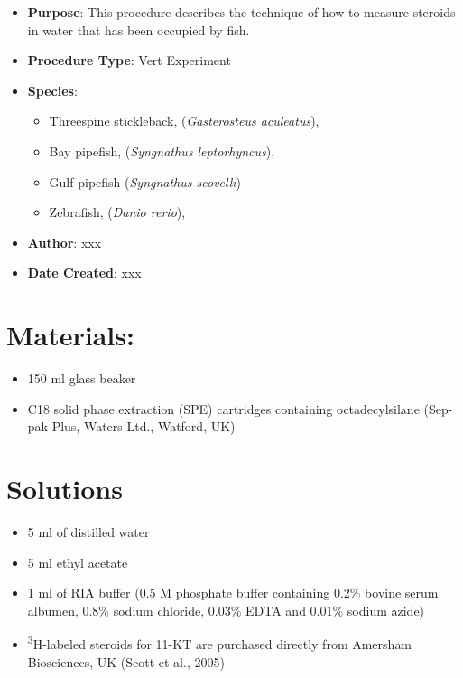 \documentclass[
  letterpaper,
  DIV=11,
  numbers=noendperiod]{scrreprt}
\providecommand{\tightlist}{%
  \setlength{\itemsep}{0pt}\setlength{\parskip}{0pt}}\usepackage{longtable,booktabs,array}
\begin{document}
\begin{itemize}
\tightlist
\item
  \textbf{Purpose}: This procedure describes the technique of how to
  measure steroids in water that has been occupied by fish.
\item
  \textbf{Procedure Type}: Vert Experiment
\item
  \textbf{Species}:

  \begin{itemize}
  \tightlist
  \item
    Threespine stickleback, (\emph{Gasterosteus aculeatus}),
  \item
    Bay pipefish, (\emph{Syngnathus leptorhyncus}),
  \item
    Gulf pipefish (\emph{Syngnathus scovelli})
  \item
    Zebrafish, (\emph{Danio rerio}),
  \end{itemize}
\item
  \textbf{Author}: xxx
\item
  \textbf{Date Created}: xxx
\end{itemize}

\hypertarget{materials}{%
\section{Materials:}\label{materials}}

\begin{itemize}
\tightlist
\item
  150 ml glass beaker
\item
  C18 solid phase extraction (SPE) cartridges containing octadecylsilane
  (Sep-pak Plus, Waters Ltd., Watford, UK)
\end{itemize}

\hypertarget{solutions-52}{%
\section{Solutions}\label{solutions-52}}

\begin{itemize}
\tightlist
\item
  5 ml of distilled water
\item
  5 ml ethyl acetate
\item
  1 ml of RIA buffer (0.5 M phosphate buffer containing 0.2\% bovine
  serum albumen, 0.8\% sodium chloride, 0.03\% EDTA and 0.01\% sodium
  azide)
\item
  \textsuperscript{3}H-labeled steroids for 11-KT are purchased directly
  from Amersham Biosciences, UK (Scott et al., 2005)
\end{itemize}
\end{document}
